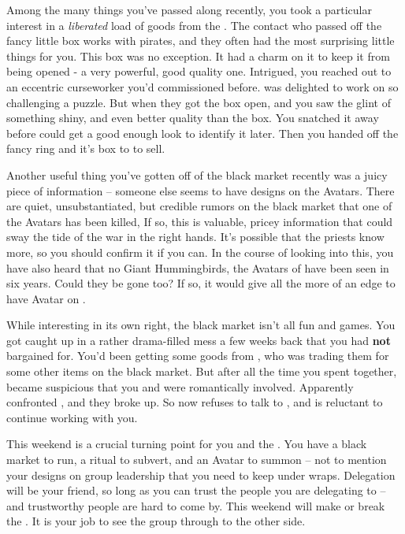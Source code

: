 \documentclass[char]{GL2020}
\begin{document}
Among the many things you’ve passed along recently, you took a particular interest in a \emph{liberated} load of goods from the \pFarm{}. The contact who passed off the fancy little box works with pirates, and they often had the most surprising little things for you. This box was no exception. It had a charm on it to keep it from being opened - a very powerful, good quality one. Intrigued, you reached out to an eccentric curseworker you’d commissioned before. \cCurse{} was delighted to work on so challenging a puzzle. But when they got the box open, and you saw the glint of something shiny, and even better quality than the box. You snatched it away before \cCurse{} could get a good enough look to identify it later. Then you handed off the fancy ring and it’s box to \cChupInventor{} to sell.

Another useful thing you’ve gotten off of the black market recently was a juicy piece of information -- someone else seems to have designs on the Avatars. There are quiet, unsubstantiated, but credible rumors on the black market that one of the \pShip{} Avatars has been killed, If so, this is valuable, pricey information that could sway the tide of the war in the right hands. It’s possible that the priests know more, so you should confirm it if you can. In the course of looking into this, you have also heard that no Giant Hummingbirds, the Avatars of \cFarmGod{} have been seen in six years. Could they be gone too? If so, it would give \cGenesis{} all the more of an edge to have \cGenesis{\their} Avatar on \pEarth{}.

While interesting in its own right, the black market isn’t all fun and games. You got caught up in a rather drama-filled mess a few weeks back that you had \textbf{not} bargained for. You’d been getting some goods from \cEthics{}, who was trading them for some other items on the black market. But after all the time you spent together, \cLibrarian{} became suspicious that you and \cEthics{} were romantically involved. Apparently \cLibrarian{} confronted \cEthics{}, and they broke up. So now \cLibrarian{} refuses to talk to \cEthics{}, and \cEthics{} is reluctant to continue working with you.

This weekend is a crucial turning point for you and the \pGoaties{}. You have a black market to run, a ritual to subvert, and an Avatar to summon -- not to mention your designs on group leadership that you need to keep under wraps. Delegation will be your friend, so long as you can trust the people you are delegating to -- and trustworthy people are hard to come by. This weekend will make or break the \pGoaties{}. It is your job to see the group through to the other side.
\end{document}
